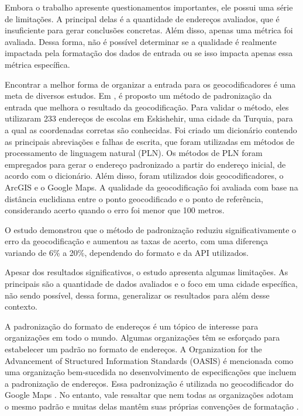 Embora o trabalho apresente questionamentos importantes, ele possui uma série de limitações. A principal delas é a quantidade de endereços avaliados, que é insuficiente para gerar conclusões concretas. Além disso, apenas uma métrica foi avaliada. Dessa forma, não é possível determinar se a qualidade é realmente impactada pela formatação dos dados de entrada ou se isso impacta apenas essa métrica específica.
 
Encontrar a melhor forma de organizar a entrada para os geocodificadores é uma meta de diversos estudos. Em \cite{KUCUKMATCI2018}, é proposto um método de padronização da entrada que melhora o resultado da geocodificação. Para validar o método, eles utilizaram 233 endereços de escolas em Eskishehir, uma cidade da Turquia, para a qual as coordenadas corretas são conhecidas. Foi criado um dicionário contendo as principais abreviações e falhas de escrita, que foram utilizadas em métodos de processamento de linguagem natural (PLN). Os métodos de PLN foram empregados para gerar o endereço padronizado a partir do endereço inicial, de acordo com o dicionário. Além disso, foram utilizados dois geocodificadores, o ArcGIS e o Google Maps. A qualidade da geocodificação foi avaliada com base na distância euclidiana entre o ponto geocodificado e o ponto de referência, considerando acerto quando o erro foi menor que 100 metros.

O estudo demonstrou que o método de padronização reduziu significativamente o erro da geocodificação e aumentou as taxas de acerto, com uma diferença variando de 6\% a 20\%, dependendo do formato e da API utilizados.

Apesar dos resultados significativos, o estudo apresenta algumas limitações. As principais são a quantidade de dados avaliados e o foco em uma cidade específica, não sendo possível, dessa forma, generalizar os resultados para além desse contexto.

A padronização do formato de endereços é um tópico de interesse para organizações em todo o mundo. Algumas organizações têm se esforçado para estabelecer um padrão no formato de endereços. A Organization for the Advancement of Structured Information Standards (OASIS) é mencionada como uma organização bem-sucedida no desenvolvimento de especificações que incluem a padronização de endereços. Essa padronização é utilizada no geocodificador do Google Maps \cite{GoogleDoc}. No entanto, vale ressaltar que nem todas as organizações adotam o mesmo padrão e muitas delas mantêm suas próprias convenções de formatação \cite{behr2010}.

